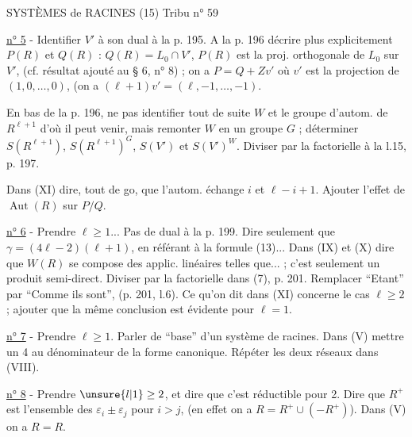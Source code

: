 SYSTÈMES de RACINES (15) \hfill Tribu n° 59

\uline{n° 5} - Identifier $V'$ à son dual à la p. 195. A la p. 196 décrire plus explicitement $P(R)$ et $Q(R)$ : $Q(R)=L_0\cap V'$, $P(R)$ est la proj. orthogonale de $L_0$ sur $V'$, (cf. résultat ajouté au § 6, n° 8) ; on a $P=Q+Zv'$ où $v'$ est la projection de $(1,0,\ldots,0)$, (on a $(\ell+1)v'=(\ell,-1,\ldots,-1)$.

En bas de la p. 196, ne pas identifier tout de suite $W$ et le groupe d'autom. de $R^{\ell+1}$ d'où il peut venir, mais remonter $W$ en un groupe $G$ ; déterminer $S(R^{\ell+1})$, $S(R^{\ell+1})^G$, $S(V')$ et $S(V')^W$. Diviser par la factorielle à la l.15, p. 197.

Dans (XI) dire, tout de go, que l'autom. échange $i$ et $\ell-i+1$. Ajouter l'effet de $\operatorname{Aut}(R)$ sur $P/Q$.

\uline{n° 6} - Prendre $\ell\geq1$... Pas de dual à la p. 199. Dire seulement que $\gamma=(4\ell-2)(\ell+1)$, en référant à la formule (13)...
Dans (IX) et (X) dire que $W(R)$ se compose des applic. linéaires telles que... ; c'est seulement un produit semi-direct. Diviser par la factorielle dans (7), p. 201. Remplacer ``Etant'' par ``Comme ils sont'', (p. 201, l.6). Ce qu'on dit dans (XI) concerne le cas $\ell\geq2$ ; ajouter que la même conclusion est évidente pour $\ell=1$.

\uline{n° 7} - Prendre $\ell\geq1$. Parler de ``base'' d'un système de racines. Dans (V) mettre un 4 au dénominateur de la forme canonique. Répéter les deux réseaux dans (VIII).

\margin{--}

\uline{n° 8} - Prendre $\unsure{l|1}\geq2$, et dire que c'est réductible pour 2. Dire que $R^+$ est l'ensemble des $\varepsilon_i\pm\varepsilon_j$ pour $i>j$, (en effet on a $R=R^+\cup(-R^+)$). Dans (V) on a $R=R$.

